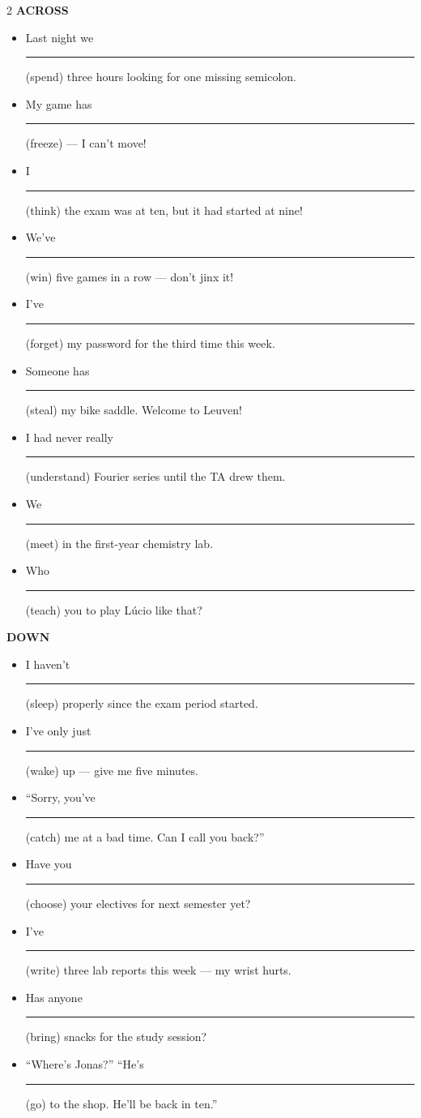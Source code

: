 \documentclass[11pt,a4paper]{article}
\newcommand{\hfont}{\fontfamily{pag}\selectfont}
\newcommand{\uifont}{\sffamily}
\newcommand{\num}[1]{\leavevmode{\uifont\bfseries\small\color{accent}#1}}
\newcommand{\blank}{\textcolor{mute}{\rule[-0.45ex]{1.25cm}{0.5pt}}}
\begin{document}
\begin{multicols}{2}
{\hfont\bfseries\small\color{accent} ACROSS}
\begin{itemize}[leftmargin=7mm,itemsep=2.2pt,labelsep=2mm]\small
\item[\num{1}] Last night we \blank{} (spend) three hours looking for one missing semicolon.
\item[\num{3}] My game has \blank{} (freeze) — I can’t move!
\item[\num{6}] I \blank{} (think) the exam was at ten, but it had started at nine!
\item[\num{7}] We’ve \blank{} (win) five games in a row — don’t jinx it!
\item[\num{9}] I’ve \blank{} (forget) my password for the third time this week.
\item[\num{11}] Someone has \blank{} (steal) my bike saddle. Welcome to Leuven!
\item[\num{13}] I had never really \blank{} (understand) Fourier series until the TA drew them.
\item[\num{14}] We \blank{} (meet) in the first-year chemistry lab.
\item[\num{15}] Who \blank{} (teach) you to play Lúcio like that?
\end{itemize}
\columnbreak
{\hfont\bfseries\small\color{accent} DOWN}
\begin{itemize}[leftmargin=7mm,itemsep=2.2pt,labelsep=2mm]\small
\item[\num{1}] I haven’t \blank{} (sleep) properly since the exam period started.
\item[\num{2}] I’ve only just \blank{} (wake) up — give me five minutes.
\item[\num{4}] “Sorry, you’ve \blank{} (catch) me at a bad time. Can I call you back?”
\item[\num{5}] Have you \blank{} (choose) your electives for next semester yet?
\item[\num{8}] I’ve \blank{} (write) three lab reports this week — my wrist hurts.
\item[\num{10}] Has anyone \blank{} (bring) snacks for the study session?
\item[\num{12}] “Where’s Jonas?” “He’s \blank{} (go) to the shop. He’ll be back in ten.”
\end{itemize}
\end{multicols}
\end{document}
